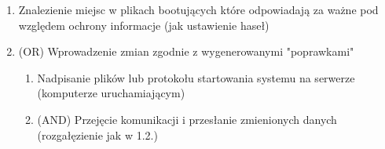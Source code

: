 \documentclass{article}
\begin{document}
\begin{enumerate}[label*=\arabic*.]
  \begin{enumerate}[label*=\arabic*.]
    \item Znalezienie miejsc w plikach bootujących które odpowiadają za ważne pod względem ochrony informacje (jak ustawienie haseł)
    \item (OR) Wprowadzenie zmian zgodnie z wygenerowanymi "poprawkami"
    \begin{enumerate}[label*=\arabic*.]
      \item Nadpisanie plików lub protokołu startowania systemu na serwerze (komputerze uruchamiającym)
      \item (AND) Przejęcie komunikacji i przesłanie zmienionych danych (rozgałęzienie jak w 1.2.)
    \end{enumerate}
  \end{enumerate}
\end{enumerate}
\end{document}
